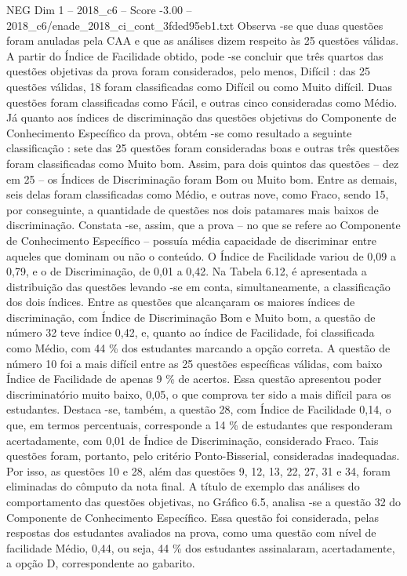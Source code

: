 \begin{textsample}{NEG Dim 1 – 2018\_c6 – Score -3.00 – 2018\_c6/enade\_2018\_ci\_cont\_3fded95eb1.txt}
Observa -se que duas questões foram anuladas pela CAA e que as análises dizem respeito às 25 questões válidas.
A partir do Índice de Facilidade obtido, pode -se concluir que três quartos das questões objetivas da prova foram considerados, pelo menos, Difícil : das 25 questões válidas, 18 foram classificadas como Difícil ou como Muito difícil.
Duas questões foram classificadas como Fácil, e outras cinco consideradas como Médio.
Já quanto aos índices de discriminação das questões objetivas do Componente de Conhecimento Específico da prova, obtém -se como resultado a seguinte classificação : sete das 25 questões foram consideradas boas e outras três questões foram classificadas como Muito bom.
Assim, para dois quintos das questões – dez em 25 – os Índices de Discriminação foram Bom ou Muito bom.
Entre as demais, seis delas foram classificadas como Médio, e outras nove, como Fraco, sendo 15, por conseguinte, a quantidade de questões nos dois patamares mais baixos de discriminação.
Constata -se, assim, que a prova – no que se refere ao Componente de Conhecimento Específico – possuía média capacidade de discriminar entre aqueles que dominam ou não o conteúdo.
O Índice de Facilidade variou de 0,09 a 0,79, e o de Discriminação, de 0,01 a 0,42.
Na Tabela 6.12, é apresentada a distribuição das questões levando -se em conta, simultaneamente, a classificação dos dois índices.
Entre as questões que alcançaram os maiores índices de discriminação, com Índice de Discriminação Bom e Muito bom, a questão de número 32 teve índice 0,42, e, quanto ao índice de Facilidade, foi classificada como Médio, com 44 \% dos estudantes marcando a opção correta.
A questão de número 10 foi a mais difícil entre as 25 questões específicas válidas, com baixo Índice de Facilidade de apenas 9 \% de acertos.
Essa questão apresentou poder discriminatório muito baixo, 0,05, o que comprova ter sido a mais difícil para os estudantes.
Destaca -se, também, a questão 28, com Índice de Facilidade 0,14, o que, em termos percentuais, corresponde a 14 \% de estudantes que responderam acertadamente, com 0,01 de Índice de Discriminação, considerado Fraco.
Tais questões foram, portanto, pelo critério Ponto-Bisserial, consideradas inadequadas.
Por isso, as questões 10 e 28, além das questões 9, 12, 13, 22, 27, 31 e 34, foram eliminadas do cômputo da nota final.
A título de exemplo das análises do comportamento das questões objetivas, no Gráfico 6.5, analisa -se a questão 32 do Componente de Conhecimento Específico.
Essa questão foi considerada, pelas respostas dos estudantes avaliados na prova, como uma questão com nível de facilidade Médio, 0,44, ou seja, 44 \% dos estudantes assinalaram, acertadamente, a opção D, correspondente ao gabarito.

\end{textsample}
